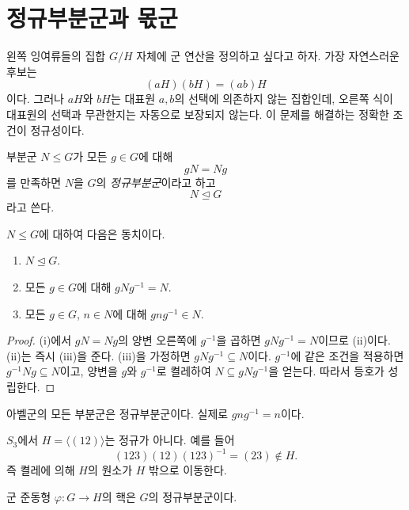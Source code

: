 \section{정규부분군과 몫군}
\label{sec:normal-quotient}

왼쪽 잉여류들의 집합 $G/H$ 자체에 군 연산을 정의하고 싶다고 하자. 가장 자연스러운 후보는
\[
  (aH)(bH)=(ab)H
\]
이다. 그러나 $aH$와 $bH$는 대표원 $a,b$의 선택에 의존하지 않는 집합인데, 오른쪽 식이 대표원의 선택과 무관한지는 자동으로 보장되지 않는다. 이 문제를 해결하는 정확한 조건이 정규성이다.

\begin{definition}[정규부분군]
부분군 $N\le G$가 모든 $g\in G$에 대해
\[
  gN=Ng
\]
를 만족하면 $N$을 $G$의 \emph{정규부분군}이라고 하고
\[
  N\trianglelefteq G
\]
라고 쓴다.
\end{definition}

\begin{proposition}[정규성의 동치 조건]
$N\le G$에 대하여 다음은 동치이다.
\begin{enumerate}[label=(\roman*)]
  \item $N\trianglelefteq G$.
  \item 모든 $g\in G$에 대해 $gNg^{-1}=N$.
  \item 모든 $g\in G$, $n\in N$에 대해 $gng^{-1}\in N$.
\end{enumerate}
\end{proposition}

\begin{proof}
(i)에서 $gN=Ng$의 양변 오른쪽에 $g^{-1}$을 곱하면 $gNg^{-1}=N$이므로 (ii)이다. (ii)는 즉시 (iii)을 준다. (iii)을 가정하면 $gNg^{-1}\subseteq N$이다. $g^{-1}$에 같은 조건을 적용하면 $g^{-1}Ng\subseteq N$이고, 양변을 $g$와 $g^{-1}$로 켤레하여 $N\subseteq gNg^{-1}$을 얻는다. 따라서 등호가 성립한다.
\end{proof}

\begin{example}
아벨군의 모든 부분군은 정규부분군이다. 실제로 $gng^{-1}=n$이다.
\end{example}

\begin{example}[비정규부분군]
$S_3$에서 $H=\langle(12)\rangle$는 정규가 아니다. 예를 들어
\[
  (123)(12)(123)^{-1}=(23)\notin H.
\]
즉 켤레에 의해 $H$의 원소가 $H$ 밖으로 이동한다.
\end{example}

\begin{proposition}
군 준동형 $\varphi:G\to H$의 핵은 $G$의 정규부분군이다.
\end{proposition}

